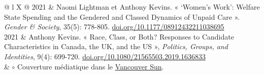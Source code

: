 \documentclass[letterpaper,fontsize=10.5pt]{scrartcl}
\begin{document}
\begin{longtblr}[entry=none,label=none]{@{} l X @{}}
	2021          & Naomi Lightman et Anthony Kevins. « `Women's Work': Welfare State Spending and the Gendered and Classed Dynamics of Unpaid Care ».  \textit{Gender \& Society}, 35(5): 778-805. \href{https://doi.org/10.1177/08912432211038695}{doi.org/10.1177/08912432211038695}                                                                         \\
	2021          & Anthony Kevins. « Race, Class, or Both? Responses to Candidate Characteristics in Canada, the UK, and the US », \textit{Politics, Groups, and Identities}, 9(4): 699-720. \href{https://doi.org/10.1080/21565503.2019.1636833}{doi.org/10.1080/21565503.2019.1636833}                                                                       \\
	& $\circ$ Couverture médiatique dans le \href{https://vancouversun.com/opinion/columnists/women-people-colour-get-fewer-votes-canada-studies}{Vancouver Sun}.                                                                                                    \\


\end{longtblr}
\end{document}
